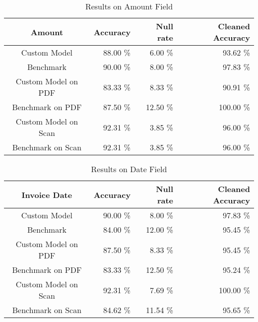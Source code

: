 \begin{table}[ht]   %
    \centering
    \footnotesize
    \begin{tabular}{c|rrr} %
        \toprule    %
        Amount  & Accuracy  & Null rate & Cleaned Accuracy \\
        \midrule    %
        Custom Model               & 88.00 \%   & 6.00 \%   & 93.62 \% \\
        Benchmark           & 90.00 \%   & 8.00 \%  & 97.83 \%\\
        \midrule    %
        Custom Model on PDF        & 83.33 \%   & 8.33 \%  & 90.91 \% \\
        Benchmark on PDF    & 87.50 \%   & 12.50 \%  & 100.00 \% \\
        \midrule    %
        Custom Model on Scan       & 92.31 \%  & 3.85 \%   & 96.00 \% \\
        Benchmark on Scan   & 92.31 \%  & 3.85 \%  & 96.00 \% \\

        \bottomrule %
    \end{tabular}
    \caption{Results on Amount Field}
    \label{table:Model_Bench_Amount}
\end{table}
\begin{table}[ht]   %
    \centering
    \footnotesize
    \begin{tabular}{c|rrr} %
        \toprule    %
        Invoice Date  & Accuracy  & Null rate & Cleaned Accuracy \\
        \midrule    %
        Custom Model               & 90.00 \%   & 8.00 \%   & 97.83 \% \\
        Benchmark           & 84.00 \%   & 12.00 \%  & 95.45 \%\\
        \midrule    %
        Custom Model on PDF        & 87.50 \%   & 8.33 \%  & 95.45 \% \\
        Benchmark on PDF    & 83.33 \%   & 12.50 \%  & 95.24 \% \\
        \midrule    %
        Custom Model on Scan       & 92.31 \%  & 7.69 \%   & 100.00 \% \\
        Benchmark on Scan   & 84.62 \%  & 11.54 \%  & 95.65 \% \\

        \bottomrule %
    \end{tabular}
    \caption{Results on Date Field}
    \label{table:Model_Bench_Date}
\end{table}


